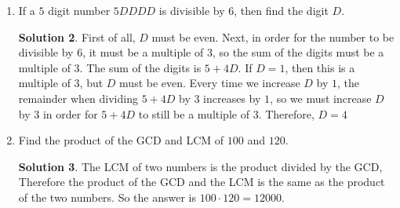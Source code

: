 \documentclass{article}
\theoremstyle{definition}
\newtheorem*{solution}{Solution}
\begin{document}
\begin{multicols}{2}
\begin{enumerate}
\begin{solution}
                We can start with the largest number using the digits $0$ through $9$
                $(\num{9876543210})$ and modify it as necessary.
                Since we want the result to be as large as possible, we should keep as
                many of the leading digits as possible and try to only change the last few digits.
                Currently, the alternating digit sum is $9 - 8 + 7 - 6 + 5 - 4 + 3 - 2 + 1 - 0
                = 5$, so we have to increase or decrease it to a multiple of $11$.
                We can't do this by only changing the last four digits, since this can only
                change the alternating digit sum by $2$.
                Therefore, we look at the last five digits.
                If we want to increase the alternating sum, we should increase the digits
                $3$ and $1$, since those are the digits that are being added to the digit sum
                as opposed to being subtracted.
                If we put $3$ and $4$ in those positions, this would make the alternating digit
                sum $11$.
                Note that there is no other way to make the alternating digit sum a multiple of
                $11$ while only changing the last five digits.
                We must put $4$ in the second-to-last position and $2$ in the third-to-last
                position, since this is the only way to make the last three digits a multiple of
                $8$.
                The leftover digit must then be $1$, so the number is $\boxed{\num{9876513240}}$.
            \end{solution}
    \item If a $5$ digit number $5DDDD$ is divisible by $6$, then find the digit $D$.
        \begin{solution}
            First of all, $D$ must be even.
            Next, in order for the number to be divisible by $6$, it must be a multiple of $3$,
            so the sum of the digits must be a multiple of $3$.
            The sum of the digits is $5 + 4D$.
            If $D = 1$, then this is a multiple of $3$, but $D$ must be even.
            Every time we increase $D$ by $1$, the remainder when dividing $5 + 4D$ by $3$
            increases by $1$, so we must increase $D$ by $3$ in order for $5 + 4D$ to still be a
            multiple of $3$.
            Therefore, $D = \boxed{4}$
        \end{solution}
    \item Find the product of the GCD and LCM of $100$ and $120$.
        \begin{solution}
            The LCM of two numbers is the product divided by the GCD,
            Therefore the product of the GCD and the LCM is the same as the product of the two
            numbers.
            So the answer is $100 \cdot 120 = \boxed{12000}$.
        \end{solution}
    \end{enumerate}
\end{multicols}
\end{document}
